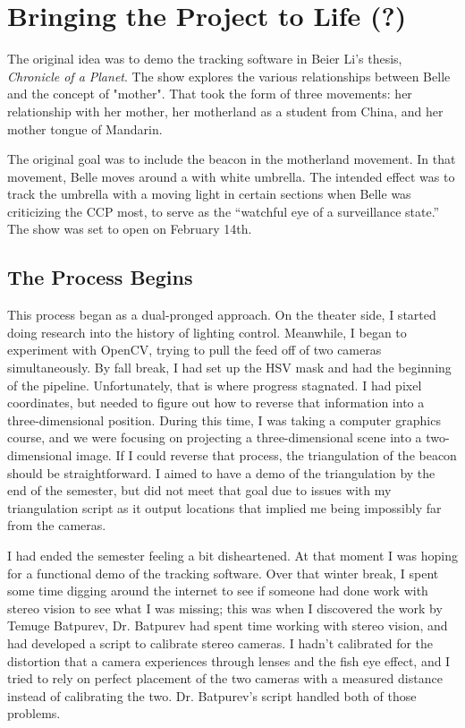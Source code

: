 \documentclass[
    12pt,
    twoside,
    bibstyle=chicago,
    headerstyle=uppercase,
	bibfile=biblatex_updating.bib
]{reedthesis}
\begin{document}
\chapter{Bringing the Project to Life (?)}
The original idea was to demo the tracking software in Beier Li's thesis, \textit{Chronicle of a Planet}. The show explores the various relationships between Belle and the concept of "mother". That took the form of three movements: her relationship with her mother, her motherland as a student from China, and her mother tongue of Mandarin.

The original goal was to include the beacon in the motherland movement. In that movement, Belle moves around a with white umbrella. The intended effect was to track the umbrella with a moving light in certain sections when Belle was criticizing the CCP most, to serve as the ``watchful eye of a surveillance state.'' The show was set to open on February 14th.

\section{The Process Begins}

This process began as a dual-pronged approach. On the theater side, I started doing research into the history of lighting control. Meanwhile, I began to experiment with OpenCV, trying to pull the feed off of two cameras simultaneously. By fall break, I had set up the HSV mask and had the beginning of the pipeline. Unfortunately, that is where progress stagnated. I had pixel coordinates, but needed to figure out how to reverse that information into a three-dimensional position. During this time, I was taking a computer graphics course, and we were focusing on projecting a three-dimensional scene into a two-dimensional image. If I could reverse that process, the triangulation of the beacon should be straightforward. I aimed to have a demo of the triangulation by the end of the semester, but did not meet that goal due to issues with my triangulation script as it output locations that implied me being impossibly far from the cameras.

I had ended the semester feeling a bit disheartened. At that moment I was hoping for a functional demo of the tracking software. Over that winter break, I spent some time digging around the internet to see if someone had done work with stereo vision to see what I was missing; this was when I discovered the work by Temuge Batpurev, Dr. Batpurev had spent time working with stereo vision, and had developed a script to calibrate stereo cameras.  I hadn't calibrated for the distortion that a camera experiences through lenses and the fish eye effect, and I tried to rely on perfect placement of the two cameras with a measured distance instead of calibrating the two. Dr. Batpurev's script handled both of those problems.
\end{document}
